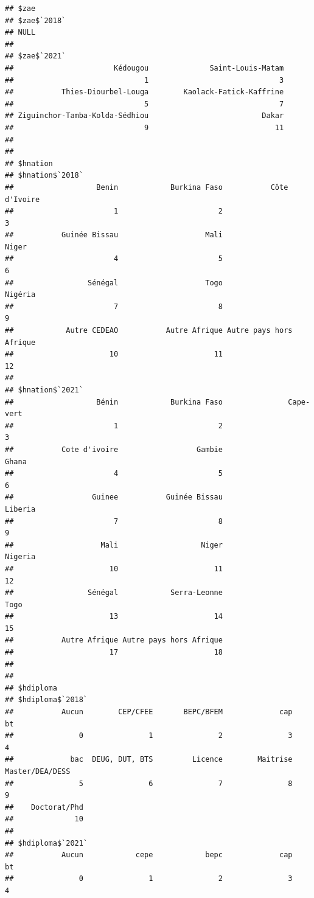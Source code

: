 \documentclass[
]{article}
\begin{document}
\begin{verbatim}
## $zae
## $zae$`2018`
## NULL
## 
## $zae$`2021`
##                       Kédougou              Saint-Louis-Matam 
##                              1                              3 
##           Thies-Diourbel-Louga        Kaolack-Fatick-Kaffrine 
##                              5                              7 
## Ziguinchor-Tamba-Kolda-Sédhiou                          Dakar 
##                              9                             11 
## 
## 
## $hnation
## $hnation$`2018`
##                   Benin            Burkina Faso           Côte d'Ivoire 
##                       1                       2                       3 
##           Guinée Bissau                    Mali                   Niger 
##                       4                       5                       6 
##                 Sénégal                    Togo                 Nigéria 
##                       7                       8                       9 
##            Autre CEDEAO           Autre Afrique Autre pays hors Afrique 
##                      10                      11                      12 
## 
## $hnation$`2021`
##                   Bénin            Burkina Faso               Cape-vert 
##                       1                       2                       3 
##           Cote d'ivoire                  Gambie                   Ghana 
##                       4                       5                       6 
##                  Guinee           Guinée Bissau                 Liberia 
##                       7                       8                       9 
##                    Mali                   Niger                 Nigeria 
##                      10                      11                      12 
##                 Sénégal            Serra-Leonne                    Togo 
##                      13                      14                      15 
##           Autre Afrique Autre pays hors Afrique 
##                      17                      18 
## 
## 
## $hdiploma
## $hdiploma$`2018`
##           Aucun        CEP/CFEE       BEPC/BFEM             cap              bt 
##               0               1               2               3               4 
##             bac  DEUG, DUT, BTS         Licence        Maitrise Master/DEA/DESS 
##               5               6               7               8               9 
##    Doctorat/Phd 
##              10 
## 
## $hdiploma$`2021`
##           Aucun            cepe            bepc             cap              bt 
##               0               1               2               3               4 

\end{verbatim}
\end{document}

